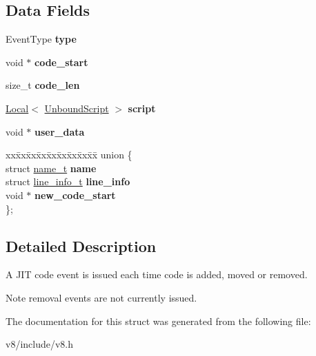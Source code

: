 \subsection*{Data Fields}
\begin{DoxyCompactItemize}
\item 
\hypertarget{structv8_1_1JitCodeEvent_ace1fbc4119ac3ef609d8e0f89cbc2c9f}{}Event\+Type {\bfseries type}\label{structv8_1_1JitCodeEvent_ace1fbc4119ac3ef609d8e0f89cbc2c9f}

\item 
\hypertarget{structv8_1_1JitCodeEvent_aeeac614e6c125bf08bf785b070090d0f}{}void $\ast$ {\bfseries code\+\_\+start}\label{structv8_1_1JitCodeEvent_aeeac614e6c125bf08bf785b070090d0f}

\item 
\hypertarget{structv8_1_1JitCodeEvent_ad56f78749d03f5db29ed417c2f3b4666}{}size\+\_\+t {\bfseries code\+\_\+len}\label{structv8_1_1JitCodeEvent_ad56f78749d03f5db29ed417c2f3b4666}

\item 
\hypertarget{structv8_1_1JitCodeEvent_a50ac4979f3d15900647b6b29dae3db76}{}\hyperlink{classv8_1_1Local}{Local}$<$ \hyperlink{classv8_1_1UnboundScript}{Unbound\+Script} $>$ {\bfseries script}\label{structv8_1_1JitCodeEvent_a50ac4979f3d15900647b6b29dae3db76}

\item 
\hypertarget{structv8_1_1JitCodeEvent_a90597e06440ebd68fe582bd1361d6de6}{}void $\ast$ {\bfseries user\+\_\+data}\label{structv8_1_1JitCodeEvent_a90597e06440ebd68fe582bd1361d6de6}

\item 
\hypertarget{structv8_1_1JitCodeEvent_a4c66ebaa0d14b47a28601446150ae617}{}\begin{tabbing}
xx\=xx\=xx\=xx\=xx\=xx\=xx\=xx\=xx\=\kill
union \{\\
\>struct \hyperlink{structv8_1_1JitCodeEvent_1_1name__t}{name\_t} {\bfseries name}\\
\>struct \hyperlink{structv8_1_1JitCodeEvent_1_1line__info__t}{line\_info\_t} {\bfseries line\_info}\\
\>void $\ast$ {\bfseries new\_code\_start}\\
\}; \label{structv8_1_1JitCodeEvent_a4c66ebaa0d14b47a28601446150ae617}
\\

\end{tabbing}\end{DoxyCompactItemize}


\subsection{Detailed Description}
A J\+I\+T code event is issued each time code is added, moved or removed.

\begin{DoxyNote}{Note}
removal events are not currently issued. 
\end{DoxyNote}


The documentation for this struct was generated from the following file\+:\begin{DoxyCompactItemize}
\item 
v8/include/v8.\+h\end{DoxyCompactItemize}
